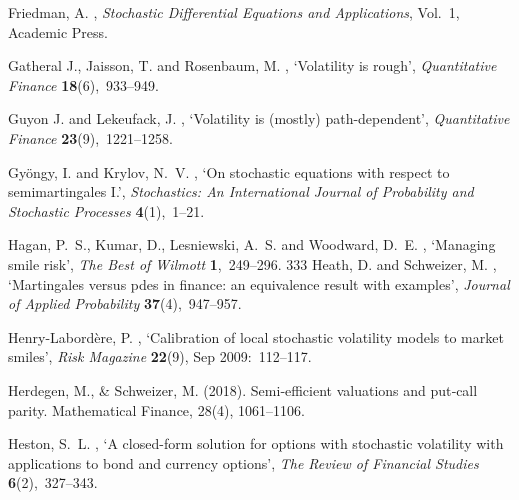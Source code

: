 \documentclass[11pt,a4paper] {article}
\begin{document}
\begin{thebibliography}{}
Friedman, A.  \harvardyearright , {\em Stochastic
  Differential Equations and Applications}, Vol.~1, Academic Press.

Gatheral J., Jaisson, T. and Rosenbaum, M. \harvardyearright , `Volatility is rough', {\em Quantitative Finance} {\bf 18}(6),~933--949.

Guyon J. and Lekeufack, J. \harvardyearright , `Volatility is (mostly) path-dependent', {\em Quantitative Finance} {\bf 23}(9),~1221--1258.

Gy{\"o}ngy, I. and Krylov, N.~V.  \harvardyearright , `On stochastic equations with respect to
  semimartingales I.', {\em Stochastics: An International Journal of
  Probability and Stochastic Processes} {\bf 4}(1),~1--21.

Hagan, P.~S., Kumar, D., Lesniewski, A.~S. and Woodward, D.~E.
  \harvardyearright , `Managing smile risk', {\em The Best
  of Wilmott} {\bf 1},~249--296.
333
Heath, D. and Schweizer, M.  \harvardyearright ,
  `Martingales versus pdes in finance: an equivalence result with examples',
  {\em Journal of Applied Probability} {\bf 37}(4),~947--957.

Henry-Labord{\`e}re, P.  \harvardyearright , `Calibration of local stochastic volatility models to market smiles', {\em Risk Magazine} {\bf 22}(9), Sep 2009:~112--117.

Herdegen, M., \& Schweizer, M. (2018). Semi‐efficient valuations and put‐call parity. Mathematical Finance, 28(4), 1061--1106.

Heston, S.~L.  \harvardyearright , `A closed-form solution
  for options with stochastic volatility with applications to bond and currency
  options', {\em The Review of Financial Studies} {\bf 6}(2),~327--343.



\end{thebibliography}
\end{document}
